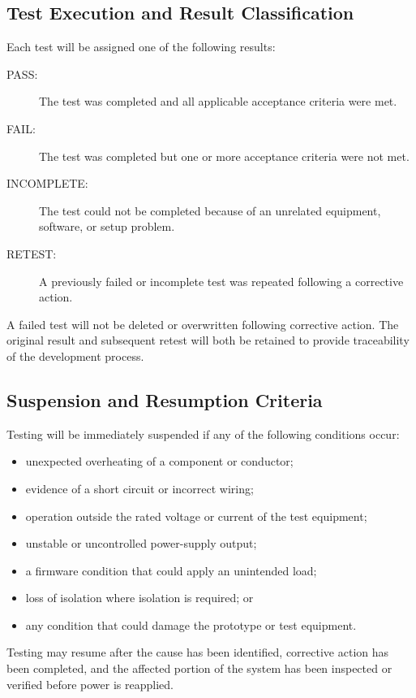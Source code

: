 \subsection{Test Execution and Result Classification}

Each test will be assigned one of the following results:

\begin{description}
	\item[PASS:] The test was completed and all applicable acceptance criteria were met.
	\item[FAIL:] The test was completed but one or more acceptance criteria were not met.
	\item[INCOMPLETE:] The test could not be completed because of an unrelated equipment,
	software, or setup problem.
	\item[RETEST:] A previously failed or incomplete test was repeated following a
	corrective action.
\end{description}

A failed test will not be deleted or overwritten following corrective action. The
original result and subsequent retest will both be retained to provide traceability
of the development process.

\subsection{Suspension and Resumption Criteria}

Testing will be immediately suspended if any of the following conditions occur:

\begin{itemize}
	\item unexpected overheating of a component or conductor;
	\item evidence of a short circuit or incorrect wiring;
	\item operation outside the rated voltage or current of the test equipment;
	\item unstable or uncontrolled power-supply output;
	\item a firmware condition that could apply an unintended load;
	\item loss of isolation where isolation is required; or
	\item any condition that could damage the prototype or test equipment.
\end{itemize}

Testing may resume after the cause has been identified, corrective action has been
completed, and the affected portion of the system has been inspected or verified
before power is reapplied.

